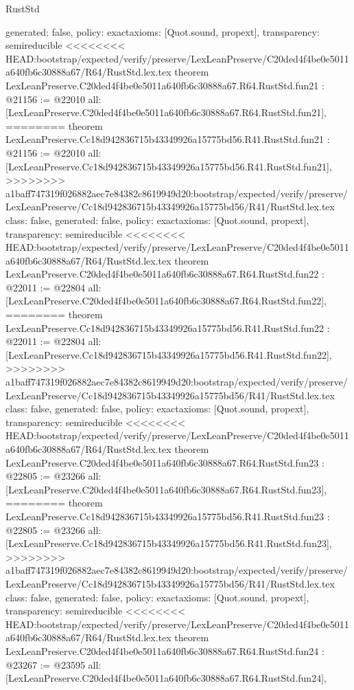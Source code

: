 \begin{lexlean}{RustStd}
\begin{coremodule}
{\begin{coremodule}
{{{{{{{{{{{{{{{{{{{{{{{{  generated: false,
  policy: exact{axioms: [Quot.sound, propext]},
  transparency: semireducible
}
<<<<<<<< HEAD:bootstrap/expected/verify/preserve/LexLeanPreserve/C20ded4f4be0e5011a640fb6c30888a67/R64/RustStd.lex.tex
theorem LexLeanPreserve.C20ded4f4be0e5011a640fb6c30888a67.R64.RustStd.fun21 : @21156 := @22010 {
  all: [LexLeanPreserve.C20ded4f4be0e5011a640fb6c30888a67.R64.RustStd.fun21],
========
theorem LexLeanPreserve.Cc18d942836715b43349926a15775bd56.R41.RustStd.fun21 : @21156 := @22010 {
  all: [LexLeanPreserve.Cc18d942836715b43349926a15775bd56.R41.RustStd.fun21],
>>>>>>>> a1baff747319f026882aec7e84382c8619949d20:bootstrap/expected/verify/preserve/LexLeanPreserve/Cc18d942836715b43349926a15775bd56/R41/RustStd.lex.tex
  class: false,
  generated: false,
  policy: exact{axioms: [Quot.sound, propext]},
  transparency: semireducible
}
<<<<<<<< HEAD:bootstrap/expected/verify/preserve/LexLeanPreserve/C20ded4f4be0e5011a640fb6c30888a67/R64/RustStd.lex.tex
theorem LexLeanPreserve.C20ded4f4be0e5011a640fb6c30888a67.R64.RustStd.fun22 : @22011 := @22804 {
  all: [LexLeanPreserve.C20ded4f4be0e5011a640fb6c30888a67.R64.RustStd.fun22],
========
theorem LexLeanPreserve.Cc18d942836715b43349926a15775bd56.R41.RustStd.fun22 : @22011 := @22804 {
  all: [LexLeanPreserve.Cc18d942836715b43349926a15775bd56.R41.RustStd.fun22],
>>>>>>>> a1baff747319f026882aec7e84382c8619949d20:bootstrap/expected/verify/preserve/LexLeanPreserve/Cc18d942836715b43349926a15775bd56/R41/RustStd.lex.tex
  class: false,
  generated: false,
  policy: exact{axioms: [Quot.sound, propext]},
  transparency: semireducible
}
<<<<<<<< HEAD:bootstrap/expected/verify/preserve/LexLeanPreserve/C20ded4f4be0e5011a640fb6c30888a67/R64/RustStd.lex.tex
theorem LexLeanPreserve.C20ded4f4be0e5011a640fb6c30888a67.R64.RustStd.fun23 : @22805 := @23266 {
  all: [LexLeanPreserve.C20ded4f4be0e5011a640fb6c30888a67.R64.RustStd.fun23],
========
theorem LexLeanPreserve.Cc18d942836715b43349926a15775bd56.R41.RustStd.fun23 : @22805 := @23266 {
  all: [LexLeanPreserve.Cc18d942836715b43349926a15775bd56.R41.RustStd.fun23],
>>>>>>>> a1baff747319f026882aec7e84382c8619949d20:bootstrap/expected/verify/preserve/LexLeanPreserve/Cc18d942836715b43349926a15775bd56/R41/RustStd.lex.tex
  class: false,
  generated: false,
  policy: exact{axioms: [Quot.sound, propext]},
  transparency: semireducible
}
<<<<<<<< HEAD:bootstrap/expected/verify/preserve/LexLeanPreserve/C20ded4f4be0e5011a640fb6c30888a67/R64/RustStd.lex.tex
theorem LexLeanPreserve.C20ded4f4be0e5011a640fb6c30888a67.R64.RustStd.fun24 : @23267 := @23595 {
  all: [LexLeanPreserve.C20ded4f4be0e5011a640fb6c30888a67.R64.RustStd.fun24],
}}}}}}}}}}}}}}}}}}}}}}}}}}}
\end{coremodule}}
\end{coremodule}
\end{lexlean}
